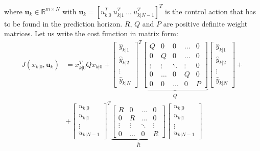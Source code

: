where $\textbf{u}_k \in \mathbb{R}^{m\times N}$ with $\textbf{u}_k = [u_{k|0}^T\ u_{k|1}^T\ ...\ u_{k|N-1}^T]^T$ is the control action that has to be found in the prediction horizon. $R$, $Q$ and $P$ are positive definite weight matrices. Let us write the cost function in matrix form: 
\begin{equation*}
\begin{split}
		J(x_{k|0},\textbf{u}_k)&=x_{k|0}^T Q x_{k|0} + 
		\left[ \begin{matrix} \hat{y}_{k|1} \\ \hat{y}_{k|2} \\ \vdots \\ \hat{y}_{k|N}	\end{matrix} \right]^T \underbrace{\left[ \begin{matrix} 
Q	 		&		 0	  	&  	0	  &  \dots  &  0 \\ 
0 			&  	 Q 	  	& 		0 	  &  \dots  &  0 \\
\vdots  	& 	  \vdots  	&   \ddots   &  \vdots &  0 \\
0 			& 	  \dots  	&      0     &      Q  &  0 \\
0			& 		 0 		&	  \dots   &      0  &  P
\end{matrix} \right]}_{\bar{Q}}
\left[ \begin{matrix} \hat{y}_{k|1} \\ \hat{y}_{k|2} \\ \vdots \\ \hat{y}_{k|N} \end{matrix} \right] +  \\ 
&+\left[ \begin{matrix} u_{k|0} \\ u_{k|1} \\ \vdots \\ u_{k|N-1} 		\end{matrix} \right]^T \underbrace{\left[ \begin{matrix} 
R	 		&		 0	  	&     \dots   &  0 \\ 
0 			&  	     R 	  	&     \dots	  &  0 \\
\vdots  	& 	  \vdots  	&    \ddots   &  \vdots \\
0			& 	  \dots     &        0    &  R
\end{matrix} \right]}_{\bar{R}}
\left[ \begin{matrix} u_{k|0} \\ u_{k|1} \\ \vdots \\ u_{k|N-1}  \end{matrix} \right] 
\end{split}
\end{equation*}
